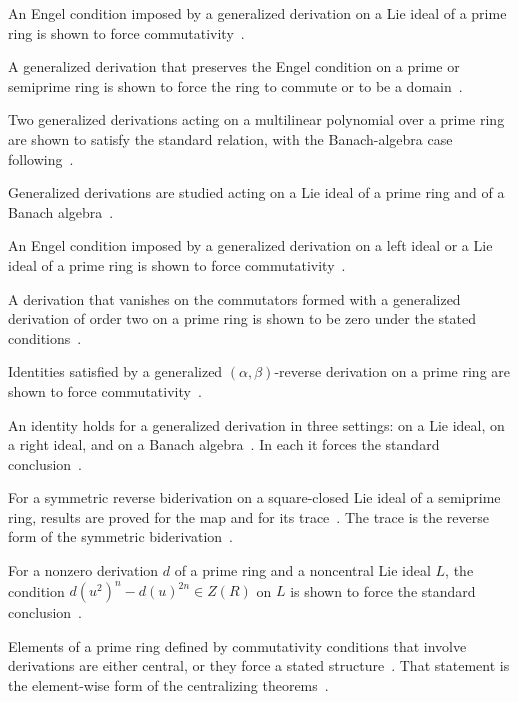 An Engel condition imposed by a generalized derivation on a Lie ideal of a
prime ring is shown to force
commutativity~\cite{WlGeneralizedDerivationsWithEnge2023}.

A generalized derivation that preserves the Engel condition on a prime or
semiprime ring is shown to force the ring to commute or to be a
domain~\cite{WlGeneralizedDerivationsPreservi2021}.

Two generalized derivations acting on a multilinear polynomial over a prime
ring are shown to satisfy the standard relation, with the Banach-algebra case
following~\cite{WlGeneralizedDerivationsActingOn2016}.

Generalized derivations are studied acting on a Lie ideal of a prime ring and
of a Banach algebra~\cite{WlGeneralizedDerivationsActingOn2023}.

An Engel condition imposed by a generalized derivation on a left ideal or a
Lie ideal of a prime ring is shown to force
commutativity~\cite{WlEngelConditionsOfGeneralizedDe2020}.

A derivation that vanishes on the commutators formed with a generalized
derivation of order two on a prime ring is shown to be zero under the stated
conditions~\cite{WlDerivationsVanishingOnCommutat2017}.

Identities satisfied by a generalized $(\alpha,\beta)$-reverse derivation on a
prime ring are shown to force
commutativity~\cite{WlCommutativityOfPrimeRingsWithG2022}.

An identity holds for a generalized derivation in three settings: on a Lie
ideal, on a right ideal, and on a Banach algebra~\cite{WlAnIdentityWithGeneralizedDeriv2012}. In each it forces the
standard conclusion~\cite{WlAnIdentityWithGeneralizedDeriv2012}.

For a symmetric reverse biderivation on a square-closed Lie ideal of a
semiprime ring, results are proved for the map and for its trace~\cite{WlSomeResultsOnLieIdealsWithSymm2018}. The trace is
the reverse form of the symmetric
biderivation~\cite{WlSomeResultsOnLieIdealsWithSymm2018}.

For a nonzero derivation $d$ of a prime ring and a noncentral Lie ideal $L$,
the condition $d(u^2)^n-d(u)^{2n}\in Z(R)$ on $L$ is shown to force the
standard conclusion~\cite{WlDerivationsAsAGeneralizationOf2019}.

Elements of a prime ring defined by commutativity conditions that involve
derivations are either central, or they force a stated structure~\cite{WlCommutingLikeElementsInPrimeRi2017}. That
statement is the element-wise form of the centralizing
theorems~\cite{WlCommutingLikeElementsInPrimeRi2017}.

